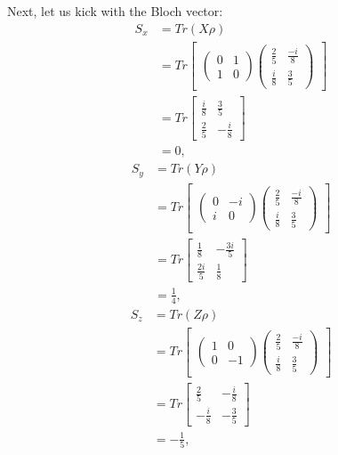 \documentclass[10pt]{article}
\begin{document}
Next, let us kick with the Bloch vector:
\begin{align*}
S_x &= Tr(X\rho) \\
      &= Tr \begin{bmatrix}
      \begin{pmatrix}
      0 & 1 \\
      1 & 0
      \end{pmatrix}
      \begin{pmatrix}
          \frac{2}{5} & \frac{-i}{8} \\
          \frac{i}{8} & \frac{3}{5}
      \end{pmatrix}
      \end{bmatrix} \\
      &= Tr \begin{bmatrix}
      \frac{i}{8}  & \frac{3}{5} \\
      \frac{2}{5} & -\frac{i}{8}
      \end{bmatrix} \\
      &= 0,
\end{align*}
\begin{align*}
S_y &= Tr(Y\rho) \\
      &= Tr \begin{bmatrix}
      \begin{pmatrix}
      0 & -i \\
      i & 0
      \end{pmatrix}
      \begin{pmatrix}
          \frac{2}{5} & \frac{-i}{8} \\
          \frac{i}{8} & \frac{3}{5}
      \end{pmatrix}
      \end{bmatrix} \\
      &= Tr \begin{bmatrix}
      \frac{1}{8}  & -\frac{3i}{5} \\
      \frac{2i}{5} & \frac{1}{8}
      \end{bmatrix} \\
      &= \frac{1}{4},
\end{align*}
\begin{align*}
S_z &= Tr(Z\rho) \\
      &= Tr \begin{bmatrix}
      \begin{pmatrix}
      1 & 0 \\
      0 & -1
      \end{pmatrix}
      \begin{pmatrix}
          \frac{2}{5} & \frac{-i}{8} \\
          \frac{i}{8} & \frac{3}{5}
      \end{pmatrix}
      \end{bmatrix} \\
      &= Tr \begin{bmatrix}
      \frac{2}{5} & -\frac{i}{8} \\
	  -\frac{i}{8} & -\frac{3}{5}
      \end{bmatrix} \\
      &= -\frac{1}{5},
\end{align*}
\end{document}
